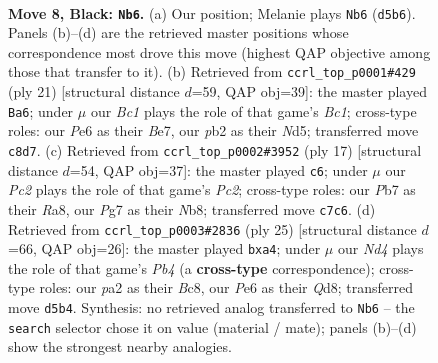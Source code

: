 \documentclass[11pt]{article}
\begin{document}
\begin{figure}[p]\centering
\begin{subfigure}{0.46\textwidth}\centering
\resizebox{\linewidth}{!}{%
\newchessgame
\chessboard[
  setfen={rnbq1rk1/ppp1bppp/4p3/3nN3/2pP4/6P1/PP2PPBP/RNBQR1K1 b - - 3 8},
  showmover=false,
  pgfstyle=straightmove, color=movearrow, markmove={d5-b6}
]}
\caption{}
\end{subfigure}\hfill
\begin{subfigure}{0.46\textwidth}\centering
\resizebox{\linewidth}{!}{%
\newchessgame
\chessboard[
  setfen={rnbq1rk1/p3bppp/2p1p3/3nN3/PppPN3/6P1/1P2PPBP/R1BQR1K1 b - - 3 11},
  showmover=false,
  pgfstyle=straightmove, color=movearrow, markmove={c8-a6}
]}
\caption{}
\end{subfigure}
\\[4pt]
\begin{subfigure}{0.46\textwidth}\centering
\resizebox{\linewidth}{!}{%
\newchessgame
\chessboard[
  setfen={rn1q1rk1/ppp1ppbp/4b1p1/3nN3/3P4/1B6/PPP2PPP/RNBQR1K1 b - - 7 9},
  showmover=false,
  pgfstyle=straightmove, color=movearrow, markmove={c7-c6}
]}
\caption{}
\end{subfigure}\hfill
\begin{subfigure}{0.46\textwidth}\centering
\resizebox{\linewidth}{!}{%
\newchessgame
\chessboard[
  setfen={r1bq1rk1/3nbppp/p2p4/1p1Np3/P3P3/6P1/1PP2PBP/R1BQK2R b KQ - 0 13},
  showmover=false,
  pgfstyle=straightmove, color=movearrow, markmove={b5-a4}
]}
\caption{}
\end{subfigure}
\caption{\textbf{Move 8, Black: \texttt{Nb6}.} (a) Our position; Melanie plays \texttt{Nb6} (\texttt{d5b6}). Panels (b)--(d) are the retrieved master positions whose correspondence most drove this move (highest QAP objective among those that transfer to it). (b) Retrieved from \texttt{ccrl\_top\_p0001\#429} (ply 21) [structural distance $d$=59, QAP obj=39]: the master played \texttt{Ba6}; under $\mu$ our \emph{Bc1} plays the role of that game's \emph{Bc1}; cross-type roles: our \emph{P}e6 as their \emph{B}e7, our \emph{p}b2 as their \emph{N}d5; transferred move \texttt{c8d7}. (c) Retrieved from \texttt{ccrl\_top\_p0002\#3952} (ply 17) [structural distance $d$=54, QAP obj=37]: the master played \texttt{c6}; under $\mu$ our \emph{Pc2} plays the role of that game's \emph{Pc2}; cross-type roles: our \emph{P}b7 as their \emph{R}a8, our \emph{P}g7 as their \emph{N}b8; transferred move \texttt{c7c6}. (d) Retrieved from \texttt{ccrl\_top\_p0003\#2836} (ply 25) [structural distance $d$=66, QAP obj=26]: the master played \texttt{bxa4}; under $\mu$ our \emph{Nd4} plays the role of that game's \emph{Pb4} (a \textbf{cross-type} correspondence); cross-type roles: our \emph{p}a2 as their \emph{B}c8, our \emph{P}e6 as their \emph{Q}d8; transferred move \texttt{d5b4}. Synthesis: no retrieved analog transferred to \texttt{Nb6} -- the \texttt{search} selector chose it on value (material / mate); panels (b)--(d) show the strongest nearby analogies.}
\label{fig:thought-m15}
\end{figure}
\end{document}
